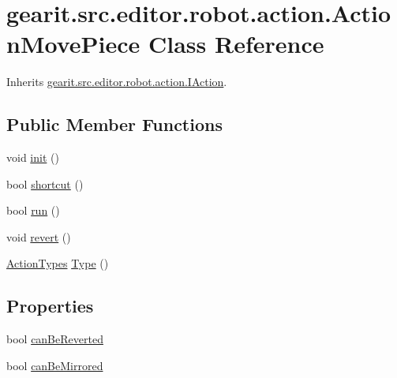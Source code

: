 \hypertarget{classgearit_1_1src_1_1editor_1_1robot_1_1action_1_1_action_move_piece}{\section{gearit.\+src.\+editor.\+robot.\+action.\+Action\+Move\+Piece Class Reference}
\label{classgearit_1_1src_1_1editor_1_1robot_1_1action_1_1_action_move_piece}
}


Inherits \hyperlink{interfacegearit_1_1src_1_1editor_1_1robot_1_1action_1_1_i_action}{gearit.\+src.\+editor.\+robot.\+action.\+I\+Action}.

\subsection*{Public Member Functions}
\begin{DoxyCompactItemize}
\item 
void \hyperlink{classgearit_1_1src_1_1editor_1_1robot_1_1action_1_1_action_move_piece_a671807f8fd8845f35554d8f784b1b04d}{init} ()
\item 
bool \hyperlink{classgearit_1_1src_1_1editor_1_1robot_1_1action_1_1_action_move_piece_a2f268a78f9f52211663c6ed28e51fd76}{shortcut} ()
\item 
bool \hyperlink{classgearit_1_1src_1_1editor_1_1robot_1_1action_1_1_action_move_piece_a20e45c3cf32ae70fdfc489492ff8bf3f}{run} ()
\item 
void \hyperlink{classgearit_1_1src_1_1editor_1_1robot_1_1action_1_1_action_move_piece_a0aa6b67f5145d1b844b5d8c3bf104a97}{revert} ()
\item 
\hyperlink{namespacegearit_1_1src_1_1editor_1_1robot_1_1action_a4be0fd46e3952d6135136b20e7b3fc5e}{Action\+Types} \hyperlink{classgearit_1_1src_1_1editor_1_1robot_1_1action_1_1_action_move_piece_ae0ca76dc37765e8c469f4f718a15f8dd}{Type} ()
\end{DoxyCompactItemize}
\subsection*{Properties}
\begin{DoxyCompactItemize}
\item 
bool \hyperlink{classgearit_1_1src_1_1editor_1_1robot_1_1action_1_1_action_move_piece_a743f64497031e84eb8e08ca16094b71a}{can\+Be\+Reverted}
\item 
bool \hyperlink{classgearit_1_1src_1_1editor_1_1robot_1_1action_1_1_action_move_piece_a971e9bd950f22587c65ceb770591c476}{can\+Be\+Mirrored}
\end{DoxyCompactItemize}


